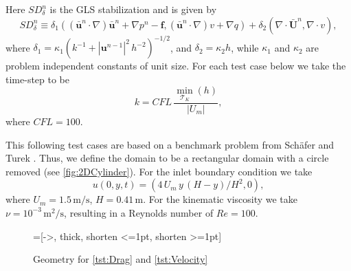 Here $SD_{\delta}^n$ is the GLS stabilization and is given by
\begin{equation}
  SD_{\delta}^n \equiv
    \delta_1 (\left(\bar{\mathbf{u}}^n \cdot \nabla \right) \bar{\mathbf{u}}^n
        + \nabla p^n - \mathbf{f},
      \left(\bar{\mathbf{u}}^n \cdot \nabla \right) v + \nabla q)
      + \delta_2 (\nabla \cdot \bar{\mathbf{U}}^n, \nabla \cdot v),
  \label{eqn:NSEStabilization}
\end{equation}
where $\delta_1 = \kappa_1 (k^{-1} + |\mathbf{u}^{n-1}|^2\, h^{-2})^{-1/2}$, and
$\delta_2 = \kappa_2 h$, while $\kappa_1$ and $\kappa_2$ are problem independent
constants of unit size. For each test case below we take the time-step to be
\begin{equation*}
  k = CFL\, \frac{\min_{\mathcal{T}_K}(h)}{|U_m|},
\end{equation*}
where $CFL=100$.

This following test cases are based on a benchmark problem from Sch\"afer and
Turek \cite[Test case 2D-2]{Schaefer1996}. Thus, we define the domain to be a
rectangular domain with a circle removed (see \autoref{fig:2DCylinder}). For the
inlet boundary condition we take
\begin{equation}
    u(0,y,t) = (4\, U_m\,y\, (H - y)/H^2, 0),
    \label{eqn:2DInlet}
\end{equation}
where $U_m = 1.5\, \text{m/s}$, $H = 0.41\, \text{m}$. For the kinematic
viscosity we take $\nu = 10^{-3}\, \text{m}^2\text{/s}$, resulting in a
Reynolds number of $Re=100$.

\begin{figure}[h]
    \centering
    =[->, thick, shorten <=1pt, shorten >=1pt]
    \caption{Geometry for \autoref{tst:Drag} and \autoref{tst:Velocity}}
    \label{fig:2DCylinder}
\end{figure}

